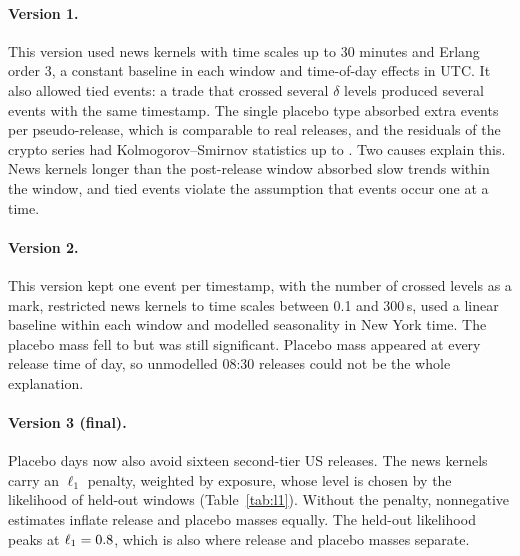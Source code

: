 \paragraph{Version 1.} This version used news kernels with time scales up to 30 minutes and Erlang
order 3, a constant baseline in each window and time-of-day effects in UTC. It also allowed tied
events: a trade that crossed several $\delta$ levels produced several events with the same
timestamp. The single placebo type absorbed \vOnePlacebo{} extra events per pseudo-release, which
is comparable to real releases, and the residuals of the crypto series had Kolmogorov--Smirnov
statistics up to \vOneKSmax. Two causes explain this. News kernels longer than the post-release
window absorbed slow trends within the window, and tied events violate the assumption that events
occur one at a time.

\paragraph{Version 2.} This version kept one event per timestamp, with the number of crossed levels
as a mark, restricted news kernels to time scales between 0.1 and 300\,s, used a linear baseline
within each window and modelled seasonality in New York time. The placebo mass fell to
\vTwoPlacebo{} but was still significant. Placebo mass appeared at every release time of day, so
unmodelled 08:30 releases could not be the whole explanation.

\paragraph{Version 3 (final).} Placebo days now also avoid sixteen second-tier US releases. The
news kernels carry an $\ell_1$ penalty, weighted by exposure, whose level is chosen by the
likelihood of held-out windows (Table~\ref{tab:l1}). Without the penalty, nonnegative estimates
inflate release and placebo masses equally. The held-out likelihood peaks at
$\ell_1=0.8$, which is also where release and placebo masses separate.

\begin{table}[!htb]\centering\small
\caption{Choice of the $\ell_1$ penalty on the news kernels. Held-out log-likelihood on the
2024 windows relative to the best level (bold), and the mean news-kernel mass of release and
placebo windows.}\label{tab:l1}

\end{table}


